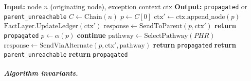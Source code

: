 \begin{algorithm}[htbp]
\caption{ChainTraversal — upward exception propagation}
\label{alg:chain-traversal}
\begin{algorithmic}[1]
\State \textbf{Input:} node $n$ (originating node), exception context $\text{ctx}$
\State \textbf{Output:} \texttt{propagated} or \texttt{parent\_unreachable}
\State
\State $C \leftarrow \text{Chain}(n)$ 
\State $p \leftarrow C[0]$ 
\State
{}
    \State $\text{ctx}' \leftarrow \text{ctx}.\text{append\_node}(p)$ 
    \State $\text{FactLayer.UpdateLedger}(\text{ctx}')$ 
    \State $\text{response} \leftarrow \text{SendToParent}(p, \text{ctx}')$ 
    \State
        \State \textbf{return} \texttt{propagated} 
        \State $p \leftarrow \alpha(p)$ 
        \State \textbf{continue}
    \Else {}
        \State $\text{pathway} \leftarrow \text{SelectPathway}(PHR)$ 
        \State $\text{response} \leftarrow \text{SendViaAlternate}(p, \text{ctx}', \text{pathway})$
        \State {} \State \textbf{return} \texttt{propagated}
         \State \textbf{return} \texttt{parent\_unreachable}
        \EndIf
    \EndIf
\EndWhile
\State \textbf{return} \texttt{propagated} 
\end{algorithmic}
\end{algorithm}

\subparagraph{Algorithm invariants.}

